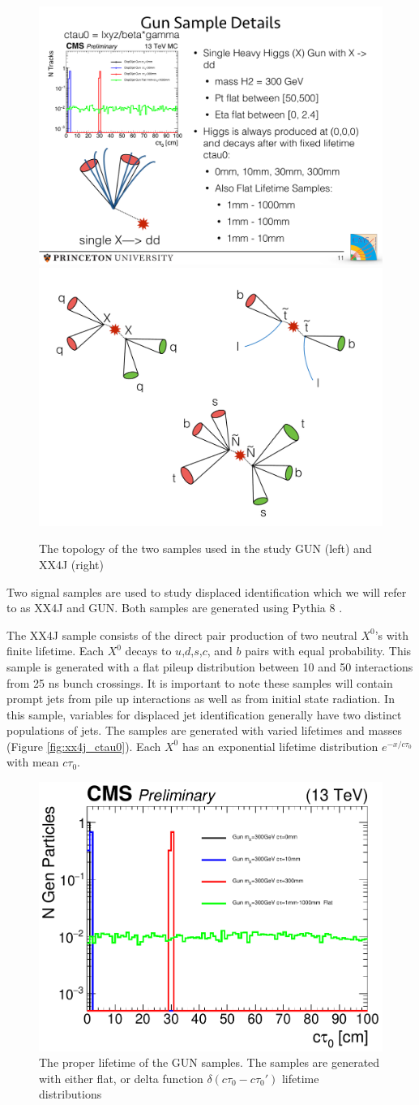 \begin{figure}
\begin{center}
\includegraphics[width=.38\textwidth]{figures/an_jetid/DIAGRAMS/dijet_gun}
\includegraphics[width=.58\textwidth]{figures/an_jetid/DIAGRAMS/xx4j_diagram}
\end{center}
\caption{The topology of the two samples used in the study GUN (left) and  XX4J (right) }
\label{fig:xx4j_gun}
\end{figure}
Two signal samples are used to study displaced identification which we will refer to as XX4J and GUN. Both samples are generated
using Pythia 8 \cite{Sjostrand:2007gs}. 

The XX4J sample consists of the direct pair production of two neutral $X^{0}$'s with finite lifetime.  
Each $X^{0}$ decays to $u$,$d$,$s$,$c$, and $b$ pairs with equal probability. This
sample is generated with a flat pileup distribution between 10 and 50 interactions
from 25 ns bunch crossings. It is important
to note these samples will contain prompt jets from pile up interactions as 
well as from initial state radiation. 
In this sample, variables for displaced jet identification generally have two distinct populations of jets. The samples are generated
with varied lifetimes and masses (Figure \ref{fig:xx4j_ctau0}). Each $X^0$ has an
exponential lifetime distribution $e^{-x / c\tau_0}$ with mean $c\tau_0$. 
\begin{figure}
\begin{center}
\includegraphics[width=.45 \textwidth]{figures/an_jetid/VTX_MATCH_IP/GUN_ctau0}
\end{center}
\caption{The proper lifetime of the GUN samples. The samples are generated with either flat, or delta function
$\delta(c\tau_0 - c\tau_0')$ lifetime distributions}
\label{fig:gun_ctau0}
\end{figure}

